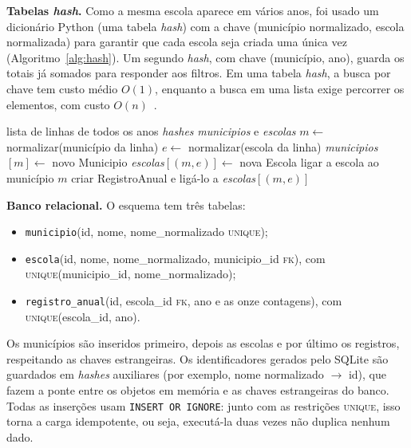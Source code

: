 \documentclass[preprint,10pt,5p]{elsarticle}
\begin{document}
\textbf{Tabelas \textit{hash}.} Como a mesma escola aparece em vários anos, foi usado um dicionário Python (uma tabela \textit{hash}) com a chave (município normalizado, escola normalizada) para garantir que cada escola seja criada uma única vez (Algoritmo~\ref{alg:hash}). Um segundo \textit{hash}, com chave (município, ano), guarda os totais já somados para responder aos filtros. Em uma tabela \textit{hash}, a busca por chave tem custo médio $O(1)$, enquanto a busca em uma lista exige percorrer os elementos, com custo $O(n)$~\citep{cormen2009algorithms}.

\begin{algorithm}[h!]
\caption{Montagem dos \textit{hashes} sem escolas repetidas}
\label{alg:hash}
\begin{algorithmic}[1]
\Require lista de linhas de todos os anos
\Ensure \textit{hashes} \textit{municipios} e \textit{escolas}
  \State $m \gets$ normalizar(município da linha)
  \State $e \gets$ normalizar(escola da linha)
    \State \textit{municipios}$[m] \gets$ novo Municipio
  \EndIf
    \State \textit{escolas}$[(m,e)] \gets$ nova Escola
    \State ligar a escola ao município $m$
  \EndIf
  \State criar RegistroAnual e ligá-lo a \textit{escolas}$[(m,e)]$
\EndFor
\end{algorithmic}
\end{algorithm}

\textbf{Banco relacional.} O esquema tem três tabelas:

\begin{itemize}
    \item \texttt{municipio}(id, nome, nome\_normalizado \textsc{unique});
    \item \texttt{escola}(id, nome, nome\_normalizado, municipio\_id \textsc{fk}), com \textsc{unique}(municipio\_id, nome\_normalizado);
    \item \texttt{registro\_anual}(id, escola\_id \textsc{fk}, ano e as onze contagens), com \textsc{unique}(escola\_id, ano).
\end{itemize}

Os municípios são inseridos primeiro, depois as escolas e por último os registros, respeitando as chaves estrangeiras. Os identificadores gerados pelo SQLite são guardados em \textit{hashes} auxiliares (por exemplo, nome normalizado $\rightarrow$ id), que fazem a ponte entre os objetos em memória e as chaves estrangeiras do banco. Todas as inserções usam \texttt{INSERT OR IGNORE}: junto com as restrições \textsc{unique}, isso torna a carga idempotente, ou seja, executá-la duas vezes não duplica nenhum dado.
\end{document}
